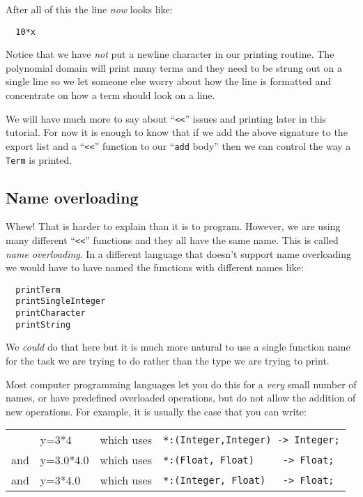 After all of this the line {\em now\/} looks like:

\begin{small}
\begin{verbatim}
  10*x
\end{verbatim}
\end{small}

Notice that we have {\em not\/} put a newline character in our printing
routine. The polynomial domain will print many terms and they
need to be strung out on a single line so we let someone else
worry about how the line is formatted and concentrate on how
a term should look on a line.

We will have much more to say about ``\verb+<<+'' issues and printing later
in this tutorial. For now it is enough to know that if we add the
above signature to the export list and a ``\verb+<<+'' function to our
``\verb"add" body'' then we can control the way a \verb"Term" is printed.

\subsection{Name overloading}

Whew! That is harder to explain than it is to program. However, we are
using many different ``\verb+<<+'' functions and they all have the same
name. This is called {\em name overloading}. In a different
language that doesn't support name overloading we would have to
have named the functions with different names like:

\begin{small}
\begin{verbatim}
  printTerm
  printSingleInteger
  printCharacter
  printString
\end{verbatim}
\end{small}

We {\em could\/} do that here but it is much more natural to use a single
function name for the task we are trying to do rather than the
type we are trying to print.

Most computer programming languages let you do this for a {\em very} small
number of names, or have predefined overloaded operations, but do not
allow the addition of new operations.
For example, it is usually the case that you can write:

\begin{tabular}{llll}
 \    & y=3*4     & which uses & \verb+*:(Integer,Integer) -> Integer;+ \\
 and  & y=3.0*4.0 & which uses & \verb+*:(Float, Float)     -> Float;+   \\
 and  & y=3*4.0   & which uses & \verb+*:(Integer, Float)   -> Float;+
\end{tabular}

